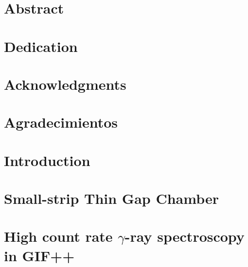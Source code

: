 








\chapter*{Abstract}



\chapter*{Dedication}


\chapter*{Acknowledgments}
\chapter*{Agradecimientos}


\tableofcontents




\chapter{Introduction}
%


\chapter{Small-strip Thin Gap Chamber}



\chapter{High count rate $\gamma$-ray spectroscopy in GIF++}\label{spectrum}
%

